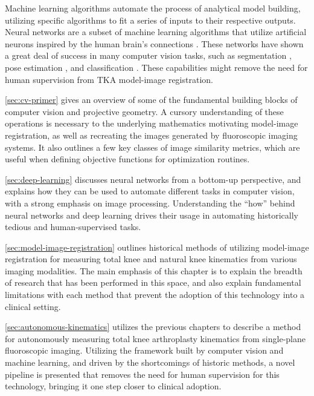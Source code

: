 Machine learning algorithms automate the process of analytical model building, utilizing specific algorithms to fit a series of inputs to their respective outputs. Neural networks are a subset of machine learning algorithms that utilize artificial neurons inspired by the human brain's connections \cite{marrEarlyProcessingVisual1976}. These networks have shown a great deal of success in many computer vision tasks, such as segmentation \cite{chanHistoSegNetSemanticSegmentation2019,wangDeepHighResolutionRepresentation2020,ronnebergerUNetConvolutionalNetworks2015}, pose estimation \cite{wuDeepGraphPose2020,kendallGeometricLossFunctions2017}, and classification \cite{krizhevskyImageNetClassificationDeep2017,qiPointNetDeepHierarchical2017,qiPointNetDeepLearning2017}. These capabilities might remove the need for human supervision from TKA model-image registration.

\cref{sec:cv-primer} gives an overview of some of the fundamental building blocks of computer vision and projective geometry. A cursory understanding of these operations is necessary to the underlying mathematics motivating model-image registration, as well as recreating the images generated by fluoroscopic imaging systems. It also outlines a few key classes of image similarity metrics, which are useful when defining objective functions for optimization routines.

\cref{sec:deep-learning} discusses neural networks from a bottom-up perspective, and explains how they can be used to automate different tasks in computer vision, with a strong emphasis on image processing. Understanding the ``how'' behind neural networks and deep learning drives their usage in automating historically tedious and human-supervised tasks.

\cref{sec:model-image-registration} outlines historical methods of utilizing model-image registration for measuring total knee and natural knee kinematics from various imaging modalities. The main emphasis of this chapter is to explain the breadth of research that has been performed in this space, and also explain fundamental limitations with each method that prevent the adoption of this technology into a clinical setting.

\cref{sec:autonomous-kinematics} utilizes the previous chapters to describe a method for autonomously measuring total knee arthroplasty kinematics from single-plane fluoroscopic imaging. Utilizing the framework built by computer vision and machine learning, and driven by the shortcomings of historic methods, a novel pipeline is presented that removes the need for human supervision for this technology, bringing it one step closer to clinical adoption.

